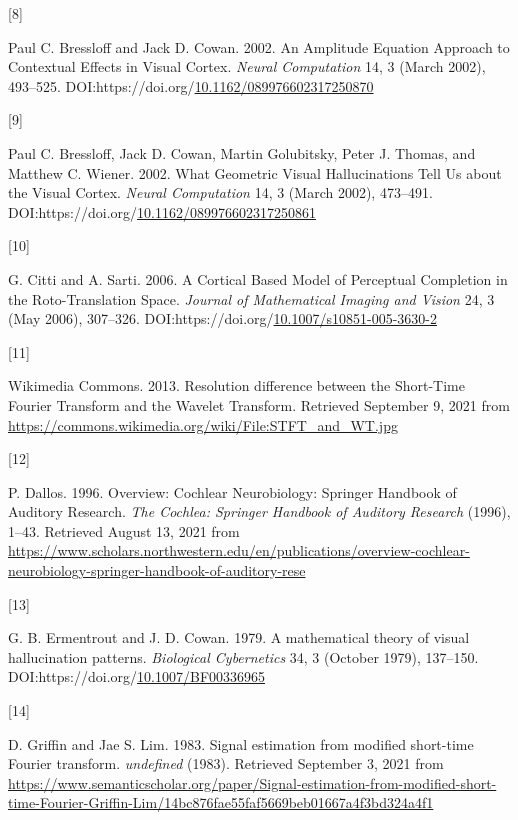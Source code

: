 \documentclass[
  american,
]{article}
\newlength{\cslhangindent}
\newlength{\csllabelwidth}
\newlength{\cslentryspacingunit} %
\newenvironment{CSLReferences}[2] %
 {%
  \setlength{\parindent}{0pt}
  \ifodd #1
  \let\oldpar\par
  \def\par{\hangindent=\cslhangindent\oldpar}
  \fi
  \setlength{\parskip}{#2\cslentryspacingunit}
 }%
 {}
\newcommand{\CSLLeftMargin}[1]{\parbox[t]{\csllabelwidth}{#1}}
\newcommand{\CSLRightInline}[1]{\parbox[t]{\linewidth - \csllabelwidth}{#1}\break}
\begin{document}
\begin{CSLReferences}{0}{0}
\leavevmode{}%
\CSLLeftMargin{{[}8{]} }
\CSLRightInline{Paul C. Bressloff and Jack D. Cowan. 2002. An {Amplitude} {Equation} {Approach} to {Contextual} {Effects} in {Visual} {Cortex}. \emph{Neural Computation} 14, 3 (March 2002), 493--525. DOI:https://doi.org/\href{https://doi.org/10.1162/089976602317250870}{10.1162/089976602317250870}}

\leavevmode{}%
\CSLLeftMargin{{[}9{]} }
\CSLRightInline{Paul C. Bressloff, Jack D. Cowan, Martin Golubitsky, Peter J. Thomas, and Matthew C. Wiener. 2002. What {Geometric} {Visual} {Hallucinations} {Tell} {Us} about the {Visual} {Cortex}. \emph{Neural Computation} 14, 3 (March 2002), 473--491. DOI:https://doi.org/\href{https://doi.org/10.1162/089976602317250861}{10.1162/089976602317250861}}

\leavevmode{}%
\CSLLeftMargin{{[}10{]} }
\CSLRightInline{G. Citti and A. Sarti. 2006. A {Cortical} {Based} {Model} of {Perceptual} {Completion} in the {Roto}-{Translation} {Space}. \emph{Journal of Mathematical Imaging and Vision} 24, 3 (May 2006), 307--326. DOI:https://doi.org/\href{https://doi.org/10.1007/s10851-005-3630-2}{10.1007/s10851-005-3630-2}}

\leavevmode{}%
\CSLLeftMargin{{[}11{]} }
\CSLRightInline{Wikimedia Commons. 2013. Resolution difference between the {Short}-{Time} {Fourier} {Transform} and the {Wavelet} {Transform}. Retrieved September 9, 2021 from \url{https://commons.wikimedia.org/wiki/File:STFT_and_WT.jpg}}

\leavevmode{}%
\CSLLeftMargin{{[}12{]} }
\CSLRightInline{P. Dallos. 1996. Overview: {Cochlear} {Neurobiology}: {Springer} {Handbook} of {Auditory} {Research}. \emph{The Cochlea: Springer Handbook of Auditory Research} (1996), 1--43. Retrieved August 13, 2021 from \url{https://www.scholars.northwestern.edu/en/publications/overview-cochlear-neurobiology-springer-handbook-of-auditory-rese}}

\leavevmode{}%
\CSLLeftMargin{{[}13{]} }
\CSLRightInline{G. B. Ermentrout and J. D. Cowan. 1979. A mathematical theory of visual hallucination patterns. \emph{Biological Cybernetics} 34, 3 (October 1979), 137--150. DOI:https://doi.org/\href{https://doi.org/10.1007/BF00336965}{10.1007/BF00336965}}

\leavevmode{}%
\CSLLeftMargin{{[}14{]} }
\CSLRightInline{D. Griffin and Jae S. Lim. 1983. Signal estimation from modified short-time {Fourier} transform. \emph{undefined} (1983). Retrieved September 3, 2021 from \url{https://www.semanticscholar.org/paper/Signal-estimation-from-modified-short-time-Fourier-Griffin-Lim/14bc876fae55faf5669beb01667a4f3bd324a4f1}}


\end{CSLReferences}
\end{document}
